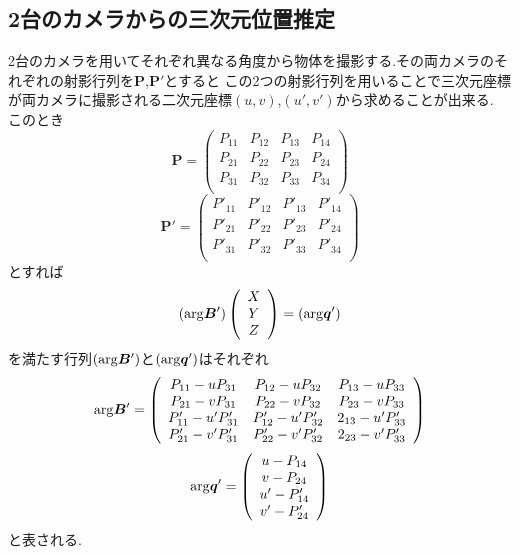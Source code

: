 \documentclass[11pt,a4j]{jsarticle}
\begin{document}
    \subsection{2台のカメラからの三次元位置推定}
    2台のカメラを用いてそれぞれ異なる角度から物体を撮影する.その両カメラのそれぞれの射影行列を$\bm{P}$,$\bm{P}'$とすると
    この2つの射影行列を用いることで三次元座標が両カメラに撮影される二次元座標$(u,v)$,$(u',v')$から求めることが出来る.
    このとき
    \begin{equation}
        \bm{P}=\left(
    \begin{array}{cccc}
      P_{11} & P_{12} & P_{13} & P_{14}\\
      P_{21} & P_{22} & P_{23} & P_{24} \\
      P_{31} & P_{32} & P_{33} & P_{34} \\
    \end{array}
        \right)
    \end{equation}
    \begin{equation}
        \bm{P}'=\left(
    \begin{array}{cccc}
      P'_{11} & P'_{12} & P'_{13} & P'_{14}\\
      P'_{21} & P'_{22} & P'_{23} & P'_{24} \\
      P'_{31} & P'_{32} & P'_{33} & P'_{34} \\
    \end{array}
        \right)
    \end{equation}
    とすれば
    \begin{equation}
        ({\rm arg}\bm{B}')\left(
        \begin{array}{c}
            X \\
            Y \\
            Z
        \end{array}
        \right)=({\rm arg}\bm{q}')
    \end{equation}
    を満たす行列$({\rm arg}\bm{B}')$と$({\rm arg}\bm{q}')$はそれぞれ
    \begin{equation}
        {\rm arg}\bm{B}'=\left(
    \begin{array}{ccc}
      P_{11}-uP_{31} & P_{12}-uP_{32} & P_{13}-uP_{33} \\
      P_{21}-vP_{31} & P_{22}-vP_{32} & P_{23}-vP_{33} \\
      P'_{11}-u'P'_{31} & P'_{12}-u'P'_{32} & 2_{13}-u'P'_{33} \\
      P'_{21}-v'P'_{31} & P'_{22}-v'P'_{32} & 2_{23}-v'P'_{33} \\
    \end{array}
        \right)
        \label{eq:argB'}
    \end{equation}
    \begin{equation}
        {\rm arg}\bm{q}' = \left(
        \begin{array}{c}
            u-P_{14} \\
            v-P_{24} \\
            u'-P'_{14} \\
            v'-P'_{24}
        \end{array}
        \right)
        \label{eq:argq'}
    \end{equation}
    と表される.
\end{document}
